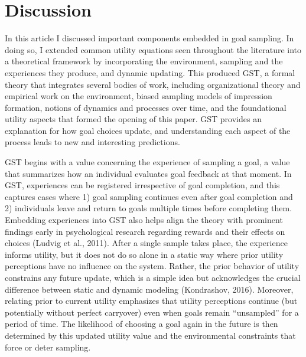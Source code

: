 \documentclass[english,,man]{apa6}
\theoremstyle{definition}
\theoremstyle{definition}
\theoremstyle{definition}
\theoremstyle{remark}
\begin{document}
\hypertarget{discussion}{%
\section{Discussion}\label{discussion}}

In this article I discussed important components embedded in goal
sampling. In doing so, I extended common utility equations seen
throughout the literature into a theoretical framework by incorporating
the environment, sampling and the experiences they produce, and dynamic
updating. This produced GST, a formal theory that integrates several
bodies of work, including organizational theory and empirical work on
the environment, biased sampling models of impression formation, notions
of dynamics and processes over time, and the foundational utility
aspects that formed the opening of this paper. GST provides an
explanation for how goal choices update, and understanding each aspect
of the process leads to new and interesting predictions.

GST begins with a value concerning the experience of sampling a goal, a
value that summarizes how an individual evaluates goal feedback at that
moment. In GST, experiences can be registered irrespective of goal
completion, and this captures cases where 1) goal sampling continues
even after goal completion and 2) individuals leave and return to goals
multiple times before completing them. Embedding experiences into GST
also helps align the theory with prominent findings early in
psychological research regarding rewards and their effects on choices
(Ludvig et al., 2011). After a single sample takes place, the experience
informs utility, but it does not do so alone in a static way where prior
utility perceptions have no influence on the system. Rather, the prior
behavior of utility constrains any future update, which is a simple idea
but acknowledges the crucial difference between static and dynamic
modeling (Kondrashov, 2016). Moreover, relating prior to current utility
emphasizes that utility perceptions continue (but potentially without
perfect carryover) even when goals remain \enquote{unsampled} for a
period of time. The likelihood of choosing a goal again in the future is
then determined by this updated utility value and the environmental
constraints that force or deter sampling.
\end{document}
